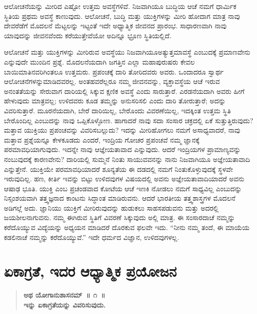 \vskip 0.3cm

ಆಲೋಚನೆಯನ್ನು ಮೀರಿದ ಎಷ್ಟೋ ಉತ್ತಮ ಅವಸ್ಥೆಗಳಿವೆ. ನಿಜವಾಗಿಯೂ ಬುದ್ಧಿಯ ಆಚೆ ನಮಗೆ ಧಾರ್ಮಿಕ ಸ್ಥಿತಿಯ ಪ್ರಥಮ ಅವಸ್ಥೆ ಕಾಣುವುದು. ಆಲೋಚನೆ, ಬುದ್ಧಿ ಮತ್ತು ಯುಕ್ತಿಗಳನ್ನು ಮೀರಿ ಹೋದಾಗ ಮಾತ್ರ ನಾವು ದೇವರೆಡೆಗೆ ಮೊದಲನೆ ಮೆಟ್ಟಲನ್ನು ಇಟ್ಟಂತೆ ಇದೇ ಅಧ್ಯಾತ್ಮಿಕ ಜೀವನದ ಪ್ರಾರಂಭ. ಸಾಧಾರಣವಾಗಿ ನಾವು ಯಾವುದನ್ನು ಜೀವನವೆಂದು ಕರೆಯುತ್ತೇವೆಯೋ ಅದಿನ್ನೂ ಭ್ರೂಣ ಸ್ಥಿತಿಯಲ್ಲಿದೆ. 

\vskip 0.3cm

ಆಲೋಚನೆ ಮತ್ತು ಯುಕ್ತಿಗಳನ್ನು ಮೀರಿರುವ ಅವಸ್ಥೆಯು ನಿಜವಾಗಿಯೂ\break ಅತ್ಯುತ್ತಮಾವಸ್ಥೆ ಎಂಬುದಕ್ಕೆ ಪ್ರಮಾಣವೇನು ಎನ್ನುವುದೇ ಮುಂದಿನ ಪ್ರಶ್ನೆ. ಮೊದಲನೆಯದಾಗಿ ಜಗತ್ತಿನ ಎಲ್ಲಾ ಮಹಾಪುರುಷರು ಕೇವಲ ಬಾಯಿಮಾತಿನವರಿಗಿಂತಲೂ ಉತ್ತಮರು. ಪ್ರಪಂಚಕ್ಕೆ ದಾರಿ ತೋರಿದವರು ಅವರು. ಒಂದಾದರೂ ಸ್ವಾರ್ಥ ಆಲೋಚನೆಗಳನ್ನು\break ಮಾಡಿದವರಲ್ಲ. ಅಂತಹವರೆಲ್ಲರೂ ನಮ್ಮ ಜೀವನವನ್ನು, ವ್ಯಕ್ತಾವಸ್ಥೆಯ ಆಚೆ ಇರುವ ಅನಂತತೆಯನ್ನು ಸೇರುವಾಗ ದಾರಿಯಲ್ಲಿ ಸಿಕ್ಕುವ ಕ್ಷಣಿಕ ಅವಸ್ಥೆ ಎಂದು ಸಾರುತ್ತಾರೆ. ಎರಡನೆಯದಾಗಿ ಅವರು ಹೀಗೆ ಹೇಳುವುದು ಮಾತ್ರವಲ್ಲ; ಉಳಿದವರು ಕೂಡ ತಮ್ಮನ್ನು ಅನುಸರಿಸಲಿ ಎಂದು ದಾರಿ ತೋರುತ್ತಾರೆ; ಅದನ್ನು ವಿವರಿಸುತ್ತಾರೆ. ಮೂರನೆಯದಾಗಿ, ಬೇರೆ ದಾರಿಯಿಲ್ಲ, ಬೇರೊಂದು ವಿವರಣೆಯಿಲ್ಲ, ಇದಕ್ಕಿಂತ ಉತ್ತಮ ಸ್ಥಿತಿ ಬೇರೊಂದಿಲ್ಲ ಎಂಬುದನ್ನು ನಾವು ಒಪ್ಪಿಕೊಳ್ಳೋಣ. ಹಾಗಾದರೆ ನಾವು ಸದಾ ಸಂಸಾರ ಚಕ್ರದಲ್ಲಿ ಏಕೆ ಸುತ್ತುತ್ತಿರುವುದು? ಮತ್ತಾವ ಯುಕ್ತಿಯು ಪ್ರಪಂಚವನ್ನು ವಿವರಿಸಬಲ್ಲುದು? ಇದನ್ನು ಮೀರಿಹೋಗಲು ನಮಗೆ ಅಸಾಧ್ಯವಾದರೆ, ನಾವು ಮತ್ತಾವ ಪ್ರಶ್ನೆಯನ್ನೂ ಕೇಳಕೂಡದು ಎಂದರೆ, ಇಂದ್ರಿಯ ಗೋಚರ ಪ್ರಪಂಚವೆ ನಮ್ಮ ಜ್ಞಾನಕ್ಕೆ ಪರಮಾವಧಿಯಾಗುವುದು. ಇದನ್ನೇ ನಾವು ಆಜ್ಞೇಯತಾವಾದ ಎನ್ನುವುದು. ಆದರೆ ಇಂದ್ರಿಯಗಳ ಪ್ರಾಮಾಣ್ಯವನ್ನು ನಂಬುವುದಕ್ಕೆ ಕಾರಣವೇನು? ದಾರಿಯಲ್ಲಿ ಸುಮ್ಮನೆ ನಿಂತು ಸಾಯುವವನನ್ನು ನಾನು ನಿಜವಾಗಿಯೂ ಅಜ್ಞೇಯತಾವಾದಿ ಎನ್ನುತ್ತೇನೆ. ಯುಕ್ತಿಯೇ ಪರಮಾವಧಿಯಾದರೆ ಶೂನ್ಯತೆಯ ಈ ದಡದಲ್ಲಿ ನಮಗೆ ನಿಂತುಕೊಳ್ಳುವುದಕ್ಕೆ ಸ್ಥಳವೇ ಇರುವುದಿಲ್ಲ. ಹಣ, ಕೀರ್ತಿ ಇವನ್ನು ಬಿಟ್ಟು ಉಳಿದವುಗಳ ವಿಷಯದಲ್ಲಿ ಅವನು ಅಜ್ಞೇಯತಾವಾದಿಯಾದರೆ ಅವನು ಆಷಾಢ ಭೂತಿ. ಯುಕ್ತಿ ಎಂಬ ಪ್ರಚಂಡವಾದ ಕೋಟೆಯ ಆಚೆ ಇಣಕಿ ನೋಡಲು ನಮಗೆ ಸಾಧ್ಯವಿಲ್ಲ ಎಂಬುದನ್ನು ನಿಸ್ಸಂಶಯವಾಗಿ ತತ್ತ್ವಜ್ಞನಾದ ಕಾಂಟನು ಸಿದ್ಧಾಂತ ಮಾಡಿರುವನು. ಆದರೆ ಭಾರತೀಯ ತತ್ತ್ವಶಾಸ್ತ್ರಗಳ ಮೊದಲನೆ ಅಡಿಗಲ್ಲೆ ಅದು. ಜ್ಞಾನಿಯು ಯುಕ್ತಿಗೆ ಮೀರಿರುವುದನ್ನು ಹುಡುಕಲು ಸಾಹಸಪಡುವನು ಮತ್ತು ಅದರಲ್ಲಿ ಜಯಶೀಲನಾಗುವನು. ನಮ್ಮ ಈಗಿರುವ ಸ್ಥಿತಿಗೆ ವಿವರಣೆ ಸಿಕ್ಕುವುದು ಅಲ್ಲಿ ಮಾತ್ರ. ಈ ಸಂಸಾರದಾಚೆ ನಮ್ಮನ್ನು ಕರೆದೊಯ್ಯುವ ವಿದ್ಯೆಯನ್ನು ಅಧ್ಯಯನ ಮಾಡಿದರೆ ದೊರಕುವ ಫಲವೇ ಇದು. “ನೀನು ನಮ್ಮ ತಂದೆ, ಈ ಮಾಯೆಯ ಕಡಲಿನಾಚೆ ನಮ್ಮನ್ನು ಕರೆದೊಯ್ಯುವೆ.” ಇದೇ ಧರ್ಮದ ವಿಜ್ಞಾನ, ಉಳಿದವುಗಳಲ್ಲ.

\chapter{ಏಕಾಗ್ರತೆ, ಇದರ ಆಧ್ಯಾತ್ಮಿಕ ಪ್ರಯೋಜನ}

\begin{verse}
\textbf{ಅಥ ಯೋಗಾನುಶಾಸನಮ್​~॥ ೧~॥\\ಇನ್ನು ಏಕಾಗ್ರತೆಯನ್ನು ವಿವರಿಸುವುದು.}
\end{verse}

